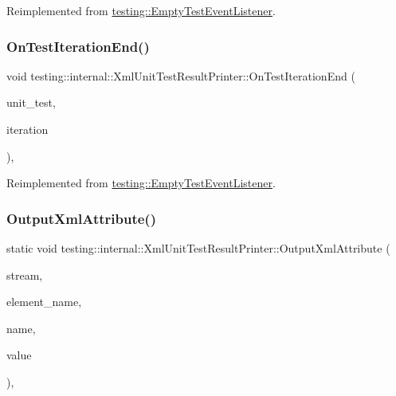 Reimplemented from \mbox{\hyperlink{classtesting_1_1_empty_test_event_listener_aae9c5c61e476f0c421402fb1dde434d2}{testing\+::\+Empty\+Test\+Event\+Listener}}.

\mbox{\label{classtesting_1_1internal_1_1_xml_unit_test_result_printer_abf972ca903d66d5ea52d9b1bc0a27f21}} 
\subsubsection{\texorpdfstring{OnTestIterationEnd()}{OnTestIterationEnd()}\hspace{0.1cm}{\footnotesize\ttfamily [3/3]}}
{\footnotesize\ttfamily void testing\+::internal\+::\+Xml\+Unit\+Test\+Result\+Printer\+::\+On\+Test\+Iteration\+End (\begin{DoxyParamCaption}\item[{const \mbox{\hyperlink{classtesting_1_1_unit_test}{Unit\+Test}} \&}]{unit\+\_\+test,  }\item[{int}]{iteration }\end{DoxyParamCaption})\hspace{0.3cm}{\ttfamily [override]}, {\ttfamily [virtual]}}



Reimplemented from \mbox{\hyperlink{classtesting_1_1_empty_test_event_listener_aae9c5c61e476f0c421402fb1dde434d2}{testing\+::\+Empty\+Test\+Event\+Listener}}.

\mbox{\label{classtesting_1_1internal_1_1_xml_unit_test_result_printer_a3ace4e5b1866dc7755079e609f046f83}} 
\subsubsection{\texorpdfstring{OutputXmlAttribute()}{OutputXmlAttribute()}\hspace{0.1cm}{\footnotesize\ttfamily [1/3]}}
{\footnotesize\ttfamily static void testing\+::internal\+::\+Xml\+Unit\+Test\+Result\+Printer\+::\+Output\+Xml\+Attribute (\begin{DoxyParamCaption}\item[{std\+::ostream $\ast$}]{stream,  }\item[{const std\+::string \&}]{element\+\_\+name,  }\item[{const std\+::string \&}]{name,  }\item[{const std\+::string \&}]{value }\end{DoxyParamCaption})\hspace{0.3cm}{\ttfamily [static]}, {\ttfamily [private]}}

